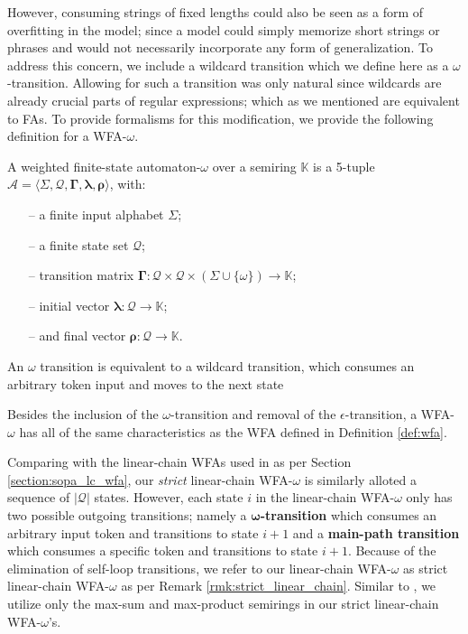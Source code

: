 However, consuming strings of fixed lengths could also be seen as a form of
overfitting in the model; since a model could simply memorize short strings or
phrases and would not necessarily incorporate any form of generalization. To
address this concern, we include a wildcard transition which we define here as a
$\omega$-transition. Allowing for such a transition was only natural since
wildcards are already crucial parts of regular expressions; which as we
mentioned are equivalent to FAs. To provide formalisms for this modification, we
provide the following definition for a WFA-$\omega$.

\begin{definition}
  \label{def:wfa_w}
  A weighted finite-state automaton-$\omega$ over a semiring $\mathbb{K}$ is a
  5-tuple $\mathcal{A} = \langle \Sigma, \mathcal{Q}, \bm{\Gamma}, \bm{\lambda}, \bm{\rho}
  \rangle$, with:

  \begin{itemize}
  \itemsep0em
    \item[--] a finite input alphabet $\Sigma$;
    \item[--] a finite state set $\mathcal{Q}$;
    \item[--] transition matrix $\bm{\Gamma}: \mathcal{Q} \times \mathcal{Q} \times (\Sigma \cup \{\omega\}) \rightarrow \mathbb{K}$;
    \item[--] initial vector $\bm{\lambda}: \mathcal{Q} \rightarrow \mathbb{K}$;
    \item[--] and final vector $\bm{\rho}: \mathcal{Q} \rightarrow \mathbb{K}$.
  \end{itemize}

  \begin{remark}
    An $\omega$ transition is equivalent to a wildcard transition, which
    consumes an arbitrary token input and moves to the next state
  \end{remark}

  \begin{remark}
    Besides the inclusion of the $\omega$-transition and removal of the
    $\epsilon$-transition, a WFA-$\omega$ has all of the same characteristics
    as the WFA defined in Definition \ref{def:wfa}.
  \end{remark}
\end{definition}

Comparing with the linear-chain WFAs used in \citet{schwartz2018sopa} as per
Section \ref{section:sopa_lc_wfa}, our \textit{strict} linear-chain WFA-$\omega$
is similarly alloted a sequence of $|\mathcal{Q}|$ states. However, each state
$i$ in the linear-chain WFA-$\omega$ only has two possible outgoing transitions;
namely a \textbf{$\bm{\omega}$-transition} which consumes an arbitrary input
token and transitions to state $i+1$ and a \textbf{main-path transition} which
consumes a specific token and transitions to state $i+1$. Because of the
elimination of self-loop transitions, we refer to our linear-chain WFA-$\omega$
as strict linear-chain WFA-$\omega$ as per Remark
\ref{rmk:strict_linear_chain}. Similar to \citet{schwartz2018sopa}, we utilize
only the max-sum and max-product semirings in our strict linear-chain
WFA-$\omega$'s.

